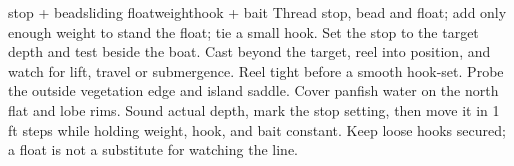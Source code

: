 
{{stop + bead}{sliding float}{weight}{hook + bait}}
{Thread stop, bead and float; add only enough weight to stand the float; tie a
small hook. Set the stop to the target depth and test beside the boat.}
{Cast beyond the target, reel into position, and watch for lift, travel or
submergence. Reel tight before a smooth hook-set.}
{Probe the outside vegetation edge and island saddle.}
{Cover panfish water on the north flat and lobe rims.}
{Sound actual depth, mark the stop setting, then move it in 1 ft steps while
holding weight, hook, and bait constant.}
{Keep loose hooks secured; a float is not a substitute for watching the line.}
